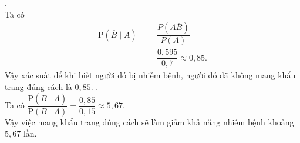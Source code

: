 \begin{ex}
{\begin{itemchoice}
		.\\
		Ta có
		\allowdisplaybreaks
		\begin{eqnarray*}
			\mathrm{P}\left(\overline{B}\mid A\right)& =& \dfrac{P\left(A\overline{B}\right)}{P(A)}
			\\
			&=&\dfrac{0{,}595}{0{,}7} \approx 0{,}85.
		\end{eqnarray*}
	Vậy xác suất để khi biết người đó bị nhiễm bệnh, người đó đã không mang khẩu trang đúng cách là $0{,}85$.
		.\\
		Ta có $\dfrac{\mathrm{P}\left(\overline{B}\mid A\right)}{\mathrm{P}(B\mid A)} = \dfrac{0{,}85}{0{,}15} \approx 5{,}67 $.\\
		Vậy việc mang khẩu trang đúng cách sẽ làm giảm khả năng nhiễm bệnh khoảng $5{,}67$ lần.
	\end{itemchoice}
}
\end{ex}
